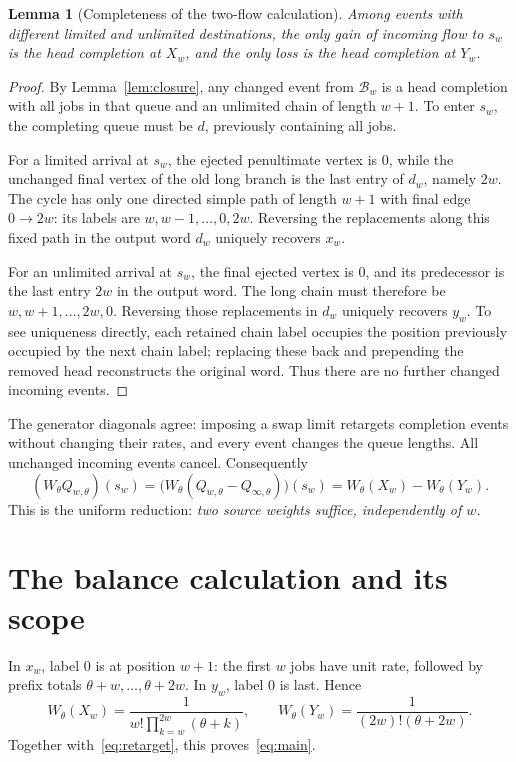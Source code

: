 \documentclass[11pt]{article}
\newtheorem{lemma}{Lemma}
\newcommand{\B}{\mathcal B_w}
\newcommand{\Qw}{Q_{w,\theta}}
\newcommand{\Qi}{Q_{\infty,\theta}}
\newcommand{\W}{W_\theta}
\begin{document}
\begin{lemma}[Completeness of the two-flow calculation]\label{lem:two}
Among events with different limited and unlimited destinations, the only gain of incoming flow to $s_w$ is the head completion at $X_w$, and the only loss is the head completion at $Y_w$.
\end{lemma}
\begin{proof}
By Lemma~\ref{lem:closure}, any changed event from $\B$ is a head completion with all jobs in that queue and an unlimited chain of length $w+1$. To enter $s_w$, the completing queue must be $d$, previously containing all jobs.

For a limited arrival at $s_w$, the ejected penultimate vertex is $0$, while the unchanged final vertex of the old long branch is the last entry of $d_w$, namely $2w$. The cycle has only one directed simple path of length $w+1$ with final edge $0\to2w$: its labels are $w,w-1,\ldots,0,2w$. Reversing the replacements along this fixed path in the output word $d_w$ uniquely recovers $x_w$.

For an unlimited arrival at $s_w$, the final ejected vertex is $0$, and its predecessor is the last entry $2w$ in the output word. The long chain must therefore be $w,w+1,\ldots,2w,0$. Reversing those replacements in $d_w$ uniquely recovers $y_w$. To see uniqueness directly, each retained chain label occupies the position previously occupied by the next chain label; replacing these back and prepending the removed head reconstructs the original word. Thus there are no further changed incoming events.
\end{proof}

The generator diagonals agree: imposing a swap limit retargets completion events without changing their rates, and every event changes the queue lengths. All unchanged incoming events cancel. Consequently
\begin{equation}\label{eq:retarget}
 (\W\Qw)(s_w)
 =\bigl(\W(\Qw-\Qi)\bigr)(s_w)
 =\W(X_w)-\W(Y_w).
\end{equation}
This is the uniform reduction: \emph{two source weights suffice, independently of $w$.}

\newpage
\section{The balance calculation and its scope}
In $x_w$, label $0$ is at position $w+1$: the first $w$ jobs have unit rate, followed by prefix totals $\theta+w,\ldots,\theta+2w$. In $y_w$, label $0$ is last. Hence
\[
 \W(X_w)=\frac{1}{w!\prod_{k=w}^{2w}(\theta+k)},\qquad
 \W(Y_w)=\frac{1}{(2w)!(\theta+2w)}.
\]
Together with~\eqref{eq:retarget}, this proves~\eqref{eq:main}.
\end{document}
